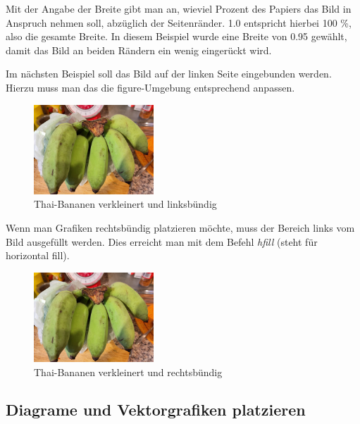 Mit der Angabe der Breite gibt man an, wieviel Prozent des Papiers das Bild in Anspruch nehmen soll, abzüglich der Seitenränder. 1.0 entspricht hierbei 100 \%, also die gesamte Breite. In diesem Beispiel wurde eine Breite von 0.95 gewählt, damit das Bild an beiden Rändern ein wenig eingerückt wird.

Im nächsten Beispiel soll das Bild auf der linken Seite eingebunden werden. Hierzu muss man das die figure-Umgebung entsprechend anpassen.


\begin{figure}[H]
	\includegraphics[width=0.4\textwidth]{../images/ThaiBananen-skaliert}
	\caption{Thai-Bananen verkleinert und linksbündig}
	\label{fig:thai-bananen-skaliert-links}
\end{figure}
		
Wenn man Grafiken rechtsbündig platzieren möchte, muss der Bereich links vom Bild ausgefüllt werden. Dies erreicht man mit dem Befehl \textit{hfill} (steht für horizontal fill).
		
\begin{figure}[H] %
	\hfill %
	\includegraphics[width=0.4\textwidth]{../images/ThaiBananen-skaliert} %
	\caption{Thai-Bananen verkleinert und rechtsbündig}
	\label{fig:thai-bananen-skaliert-rechts}
\end{figure}


\subsection{Diagrame und Vektorgrafiken platzieren}

